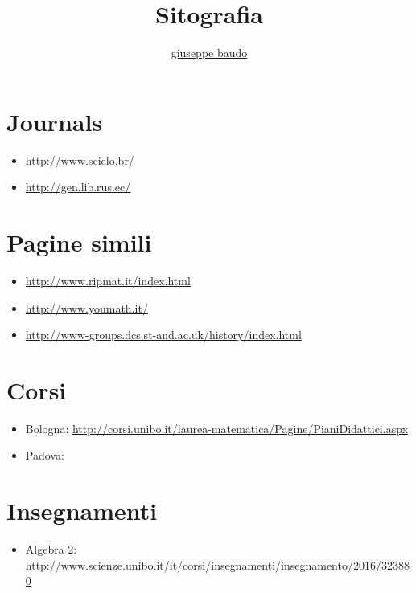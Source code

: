 \documentclass[a4paper,10pt]{article}
\title{Sitografia}
\author{\href{http://www.baudo.hol.es}{giuseppe baudo}}
\begin{document}
\maketitle

\section{Journals}
\begin{itemize}
 \item \url{http://www.scielo.br/}
 \item \url{http://gen.lib.rus.ec/}
\end{itemize}

\section{Pagine simili}
\begin{itemize}
 \item \url{http://www.ripmat.it/index.html}
 \item \url{http://www.youmath.it/}
 \item \url{http://www-groups.dcs.st-and.ac.uk/history/index.html}
\end{itemize}

\section{Corsi}
\begin{itemize}
 \item Bologna: \url{http://corsi.unibo.it/laurea-matematica/Pagine/PianiDidattici.aspx}
 \item Padova: \url{}
\end{itemize}

\section{Insegnamenti}
\begin{itemize}
 \item Algebra 2: \url{http://www.scienze.unibo.it/it/corsi/insegnamenti/insegnamento/2016/323880}
\end{itemize}
\end{document}
